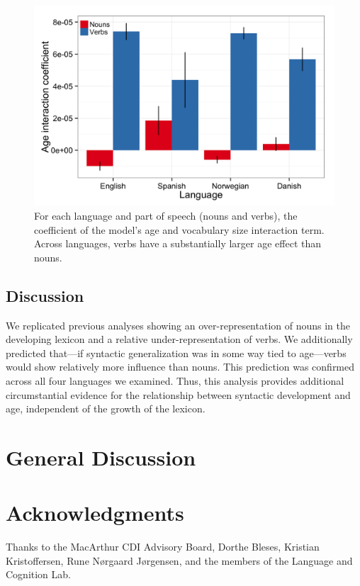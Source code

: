 \documentclass[10pt,letterpaper]{article}
\begin{document}
\begin{figure}[tb]
\begin{center}
\includegraphics[width=\linewidth]{plots/coefs_noun_verb.png}
\end{center}
\caption{\label{fig:coefs_noun_verb} For each language and part of speech (nouns and verbs), the coefficient of the model's age and vocabulary size interaction term. Across languages, verbs have a substantially larger age effect than nouns.}
\end{figure}

\subsection{Discussion}

We replicated previous analyses showing an over-representation of nouns in the developing lexicon and a relative under-representation of verbs. We additionally predicted that---if syntactic generalization was in some way tied to age---verbs would show relatively more influence than nouns. This prediction was confirmed across all four languages we examined. Thus, this analysis provides additional circumstantial evidence for the relationship between syntactic development and age, independent of the growth of the lexicon.

\section{General Discussion}

\lipsum[2-4]

\section{Acknowledgments}

Thanks to the MacArthur CDI Advisory Board, Dorthe Bleses, Kristian Kristoffersen, Rune N\o rgaard J\o rgensen, and the members of the Language and Cognition Lab. 



\setlength{\bibleftmargin}{.125in}
\setlength{\bibindent}{-\bibleftmargin}


\end{document}

